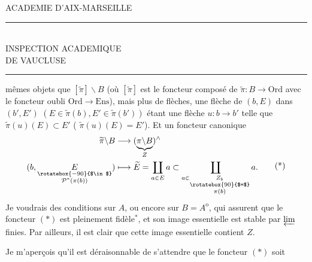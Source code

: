 \begin{center}
ACADEMIE D'AIX-MARSEILLE\\
\rule{4em}{0.4pt}\\
INSPECTION ACADEMIQUE\\
DE VAUCLUSE\\
\rule{1.6em}{0.4pt}
\end{center}
mêmes objets que $[\widetilde\pi]\backslash B$ (où $[\widetilde\pi]$ est le foncteur composé de $\widetilde\pi:B\longrightarrow\mathrm{Ord}$ avec le foncteur oubli $\mathrm{Ord}\longrightarrow\mathrm{Ens}$), mais plus de flèches, une flèche de $(b,E)$ dans $(b',E')$ $(E\in\widetilde\pi(b),E'\in\widetilde\pi(b'))$ étant une flèche $u:b\longrightarrow b'$ telle que  $\widetilde\pi(u)(E)\subset E'$ ( $\widetilde\pi(u)(E)=E'$).
Et  un foncteur canonique
\[
 \begin{aligned}
 \widetilde\pi\backslash B&\longrightarrow(\underbrace{\pi\backslash B}_Z)^\wedge\\
 (b,\underset{\substack{\rotatebox{-90}{$\in$}\\\mathcal P^*(\pi(b))}}{E})&\longmapsto
 \widetilde E=\coprod_{a\in E}a\subset\coprod_{a\in\underset{\substack{\rotatebox{90}{$=$}\\\pi(b)}}{Z_b}}a .
 \end{aligned}\tag*{(*)}
\]
Je voudrais des conditions sur $A$, ou encore sur $B=A^{\mathrm o}$, qui assurent que  le foncteur $(*)$ est pleinement fidèle$^*$, et son image essentielle est  stable par $\varprojlim$ finies. Par ailleurs, il est clair que cette image essentielle contient $Z$.

Je m'aperçois qu'il est déraisonnable de s'attendre que le foncteur $(*)$ soit

